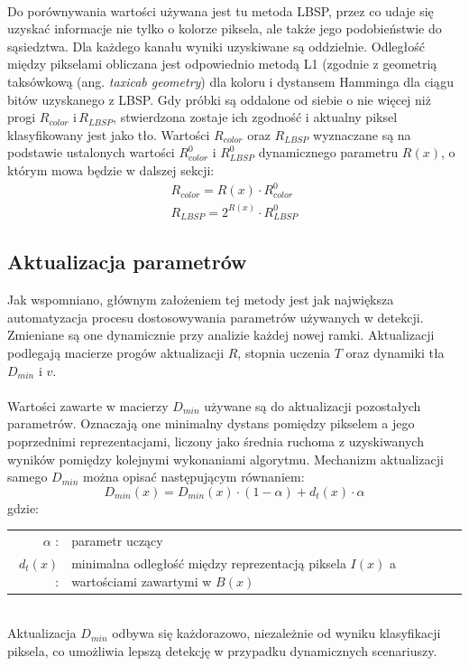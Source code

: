 \paragraph{}
Do porównywania wartości używana jest tu metoda LBSP, przez co udaje się uzyskać informacje nie tylko o kolorze piksela, ale także jego podobieństwie do sąsiedztwa. Dla każdego kanału wyniki uzyskiwane są oddzielnie. Odległość między pikselami obliczana jest odpowiednio metodą L1 (zgodnie z geometrią taksówkową (ang. \textit{taxicab geometry}) dla koloru i dystansem Hamminga dla ciągu bitów uzyskanego z LBSP. Gdy próbki są oddalone od siebie o nie więcej niż progi $R_{color}$ i\,$R_{LBSP}$, stwierdzona zostaje ich zgodność i aktualny piksel klasyfikowany jest jako tło. Wartości $R_{color}$ oraz $R_{LBSP}$ wyznaczane są na podstawie ustalonych wartości $R_{color}^{0}$ i $R_{LBSP}^{0}$ dynamicznego parametru $R(x)$, o którym mowa będzie w dalszej sekcji:
\begin{gather}
R_{color} = R(x)\cdot R_{color}^{0} \\
R_{LBSP} = 2^{R(x)}\cdot R_{LBSP}^{0}
\end{gather}
\subsection{Aktualizacja parametrów}
Jak wspomniano, głównym założeniem tej metody jest jak największa automatyzacja procesu dostosowywania parametrów używanych w detekcji. Zmieniane są one dynamicznie przy analizie każdej nowej ramki. Aktualizacji podlegają macierze progów aktualizacji $R$, stopnia uczenia $T$ oraz dynamiki tła $D_{min}$ i $v$.
\paragraph{}
Wartości zawarte w macierzy $D_{min}$ używane są do aktualizacji pozostałych parametrów. Oznaczają one minimalny dystans pomiędzy pikselem a jego poprzednimi reprezentacjami, liczony jako średnia ruchoma z uzyskiwanych wyników pomiędzy kolejnymi wykonaniami algorytmu. Mechanizm aktualizacji samego $D_{min}$ można opisać następującym równaniem:
\begin{equation}
D_{min}(x) = D_{min}(x)\cdot (1-\alpha)+d_{t}(x)\cdot \alpha
\end{equation}
gdzie:\\ 
\hspace*{3em}
\begin{tabular}{r l}
$\alpha$ : &  parametr uczący\\
$d_{t}(x)$ : & minimalna odległość między reprezentacją piksela $I(x)$ a wartościami zawartymi w $B(x)$
\end{tabular} \\
Aktualizacja $D_{min}$ odbywa się każdorazowo, niezależnie od wyniku klasyfikacji piksela, co umożliwia lepszą detekcję w przypadku dynamicznych scenariuszy.
